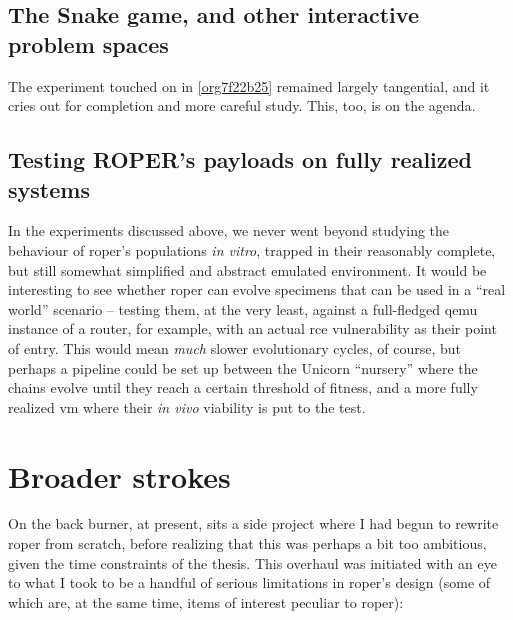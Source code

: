 \documentclass[12pt,glossary]{dalthesis}
\begin{document}
\subsection{The Snake game, and other interactive problem spaces}
\label{sec:org8b1b616}

The experiment touched on in \ref{org7f22b25} remained largely tangential,
and it cries out for completion and more careful study. This, too, is on the agenda. 

\subsection{Testing ROPER's payloads on fully realized systems}
\label{sec:org1adf802}

In the experiments discussed above, we never went beyond studying the behaviour
of \gls{roper}'s populations \emph{in vitro}, trapped in their reasonably complete, but
still somewhat simplified and abstract emulated environment. It would be interesting
to see whether \gls{roper} can evolve specimens that can be used in a ``real world''
scenario -- testing them, at the very least, against a full-fledged \gls{qemu} instance
of a router, for example, with an actual \gls{rce} vulnerability as their point of
entry. This would mean \emph{much} slower evolutionary cycles, of course, but perhaps
a pipeline could be set up between the Unicorn ``nursery'' where the chains evolve 
until they reach a certain threshold of fitness, and a more fully realized \gls{vm}
where their \emph{in vivo} viability is put to the test. 


\section{Broader strokes}
\label{sec:org6e0f232}

On the back burner, at present, sits a side project where I had begun to rewrite
\gls{roper} from scratch, before realizing that this was perhaps a bit too
ambitious, given the time constraints of the thesis. This overhaul was initiated
with an eye to what I took to be a handful of serious limitations in \gls{roper}'s
design (some of which are, at the same time, items of interest peculiar to \gls{roper}):
\end{document}
